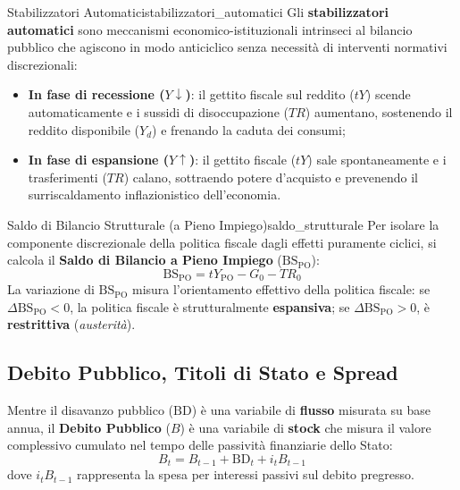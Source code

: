 \begin{definizione}{Stabilizzatori Automatici}{stabilizzatori_automatici}
Gli \textbf{stabilizzatori automatici} sono meccanismi economico-istituzionali intrinseci al bilancio pubblico che agiscono in modo anticiclico senza necessità di interventi normativi discrezionali:
\begin{itemize}
    \item \textbf{In fase di recessione ($Y \downarrow$)}: il gettito fiscale sul reddito ($tY$) scende automaticamente e i sussidi di disoccupazione ($TR$) aumentano, sostenendo il reddito disponibile ($Y_d$) e frenando la caduta dei consumi;
    \item \textbf{In fase di espansione ($Y \uparrow$)}: il gettito fiscale ($tY$) sale spontaneamente e i trasferimenti ($TR$) calano, sottraendo potere d'acquisto e prevenendo il surriscaldamento inflazionistico dell'economia.
\end{itemize}
\end{definizione}

\begin{definizione}{Saldo di Bilancio Strutturale (a Pieno Impiego)}{saldo_strutturale}
Per isolare la componente discrezionale della politica fiscale dagli effetti puramente ciclici, si calcola il \textbf{Saldo di Bilancio a Pieno Impiego} ($\mathrm{BS}_{\mathrm{PO}}$):
\begin{equation}
    \mathrm{BS}_{\mathrm{PO}} = t Y_{\mathrm{PO}} - G_0 - TR_0
\end{equation}
La variazione di $\mathrm{BS}_{\mathrm{PO}}$ misura l'orientamento effettivo della politica fiscale: se $\Delta \mathrm{BS}_{\mathrm{PO}} < 0$, la politica fiscale è strutturalmente \textbf{espansiva}; se $\Delta \mathrm{BS}_{\mathrm{PO}} > 0$, è \textbf{restrittiva} (\textit{austerità}).
\end{definizione}

\subsection{Debito Pubblico, Titoli di Stato e Spread}
Mentre il disavanzo pubblico ($\mathrm{BD}$) è una variabile di \textbf{flusso} misurata su base annua, il \textbf{Debito Pubblico} ($B$) è una variabile di \textbf{stock} che misura il valore complessivo cumulato nel tempo delle passività finanziarie dello Stato:
\begin{equation}
    B_t = B_{t-1} + \mathrm{BD}_t + i_t B_{t-1}
\end{equation}
dove $i_t B_{t-1}$ rappresenta la spesa per interessi passivi sul debito pregresso.

